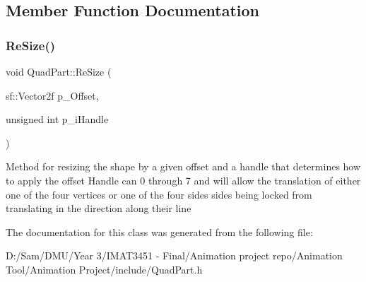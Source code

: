 \subsection{Member Function Documentation}
\mbox{\label{class_quad_part_abd2f83c6c31cb1a05c97bc5711a22564}} 
\subsubsection{\texorpdfstring{Re\+Size()}{ReSize()}}
{\footnotesize\ttfamily void Quad\+Part\+::\+Re\+Size (\begin{DoxyParamCaption}\item[{sf\+::\+Vector2f}]{p\+\_\+\+Offset,  }\item[{unsigned int}]{p\+\_\+i\+Handle }\end{DoxyParamCaption})}

Method for resizing the shape by a given offset and a handle that determines how to apply the offset Handle can 0 through 7 and will allow the translation of either one of the four vertices or one of the four sides sides being locked from translating in the direction along their line 

The documentation for this class was generated from the following file\+:\begin{DoxyCompactItemize}
\item 
D\+:/\+Sam/\+D\+M\+U/\+Year 3/\+I\+M\+A\+T3451 -\/ Final/\+Animation project repo/\+Animation Tool/\+Animation Project/include/Quad\+Part.\+h\end{DoxyCompactItemize}
